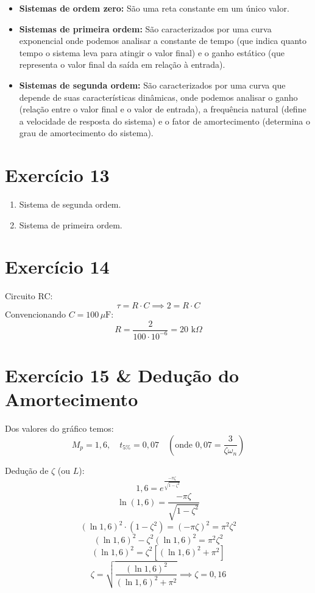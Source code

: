 \begin{itemize}
    \item \textbf{Sistemas de ordem zero:} São uma reta constante em um único valor.
    \item \textbf{Sistemas de primeira ordem:} São caracterizados por uma curva exponencial onde podemos analisar a constante de tempo (que indica quanto tempo o sistema leva para atingir o valor final) e o ganho estático (que representa o valor final da saída em relação à entrada).
    \item \textbf{Sistemas de segunda ordem:} São caracterizados por uma curva que depende de suas características dinâmicas, onde podemos analisar o ganho (relação entre o valor final e o valor de entrada), a frequência natural (define a velocidade de resposta do sistema) e o fator de amortecimento (determina o grau de amortecimento do sistema).
\end{itemize}

\section*{Exercício 13}

\begin{enumerate}
    \item[\textbf{a)}] Sistema de segunda ordem.
    \item[\textbf{b)}] Sistema de primeira ordem.
\end{enumerate}

\section*{Exercício 14}

Circuito RC:
\[
\tau = R \cdot C \implies 2 = R \cdot C
\]
Convencionando $C = 100\,\mu\text{F}$:
\[
R = \frac{2}{100 \cdot 10^{-6}} = 20\text{ k}\Omega
\]

\section*{Exercício 15 \& Dedução do Amortecimento}

Dos valores do gráfico temos:
\[
M_p = 1{,}6, \quad t_{5\%} = 0{,}07 \quad \left(\text{onde } 0{,}07 = \frac{3}{\zeta \omega_n}\right)
\]

Dedução de $\zeta$ (ou $L$):
\[
1{,}6 = e^{\frac{-\pi \zeta}{\sqrt{1 - \zeta^2}}}
\]
\[
\ln(1{,}6) = \frac{-\pi \zeta}{\sqrt{1 - \zeta^2}}
\]
\[
\left(\ln 1{,}6\right)^2 \cdot (1 - \zeta^2) = (-\pi \zeta)^2 = \pi^2 \zeta^2
\]
\[
(\ln 1{,}6)^2 - \zeta^2 (\ln 1{,}6)^2 = \pi^2 \zeta^2
\]
\[
(\ln 1{,}6)^2 = \zeta^2 \left[ (\ln 1{,}6)^2 + \pi^2 \right]
\]
\[
\zeta = \sqrt{\frac{(\ln 1{,}6)^2}{(\ln 1{,}6)^2 + \pi^2}} \implies \zeta = 0{,}16
\]

